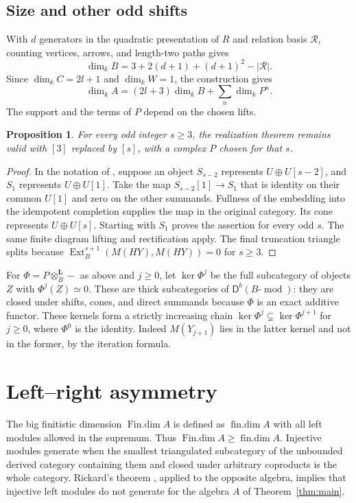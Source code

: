 \documentclass[11pt]{article}
\numberwithin{equation}{section}
\newtheorem{proposition}[theorem]{Proposition}
\theoremstyle{definition}
\theoremstyle{remark}
\newcommand{\D}{\mathsf D}
\newcommand{\otL}{\otimes^{\mathbf L}}
\DeclareMathOperator{\Ext}{Ext}
\DeclareMathOperator{\findim}{fin.dim}
\DeclareMathOperator{\Findim}{Fin.dim}
\DeclareMathOperator{\modu}{mod}
\begin{document}
\subsection{Size and other odd shifts}
With $d$ generators in the quadratic presentation of $R$ and relation
basis $\mathcal R$, counting vertices, arrows, and length-two paths gives
\[
\dim_k B=3+2(d+1)+(d+1)^2-|\mathcal R|.
\]
Since $\dim_k C=2l+1$ and $\dim_k W=1$, the construction gives
\[
\dim_k A=(2l+3)\dim_k B+\sum_n\dim_k P^n.
\]
The support and the terms of $P$ depend on the chosen lifts.

\begin{proposition}
For every odd integer $s\ge3$, the realization theorem remains valid
with $[3]$ replaced by $[s]$, with a complex $P$ chosen for that $s$.
\end{proposition}
\begin{proof}
In the notation of , suppose an object
$S_{s-2}$ represents $U\oplus U[s-2]$, and $S_1$ represents
$U\oplus U[1]$. Take the map $S_{s-2}[1]\to S_1$ that is identity
on their common $U[1]$ and zero on the other summands. Fullness of
the embedding into the idempotent completion supplies the map in
the original category. Its cone represents $U\oplus U[s]$.
Starting with $S_1$ proves the assertion for every odd $s$.
The same finite diagram lifting and rectification apply.
The final truncation triangle splits because
$\Ext_B^{s+1}(M(HY),M(HY))=0$ for $s\ge3$.
\end{proof}

For $\Phi=P\otL_B-$ as above and $j\ge0$, let $\ker\Phi^j$ be the
full subcategory of objects $Z$ with $\Phi^j(Z)\simeq0$.
These are thick subcategories of $\D^b(B\text{-}\modu)$:
they are closed under shifts, cones, and direct summands because $\Phi$
is an exact additive functor. These kernels form a strictly increasing chain
$\ker\Phi^j\subsetneq\ker\Phi^{j+1}$ for $j\ge0$, where
$\Phi^0$ is the identity. Indeed $M(Y_{j+1})$ lies in the latter
kernel and not in the former, by the iteration formula.

\section{Left--right asymmetry}
The big finitistic dimension $\Findim A$ is defined as $\findim A$
with all left modules allowed in the supremum. Thus $\Findim A\ge\findim A$.
Injective modules generate when the smallest triangulated subcategory
of the unbounded derived category containing them and closed under
arbitrary coproducts is the whole category. Rickard's theorem
\cite[Theorem~4.3]{Rickard2019}, applied to the opposite algebra,
implies that injective left modules do not generate for the algebra
$A$ of Theorem~\ref{thm:main}.
\end{document}
